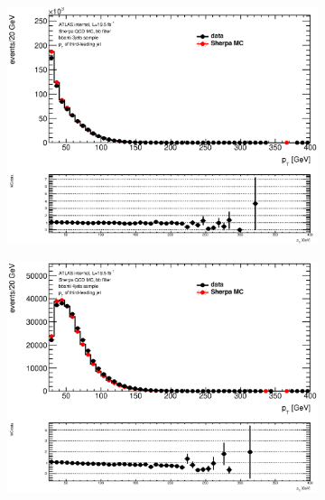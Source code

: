 \begin{figure}[phtb!]
\begin{center}
  \begin{subfigure}[$bbanti$ 3 jet category]{0.3\textwidth}\includegraphics[width=\textwidth]{MonteCarlo/figures/pt2_bbanti_3jets.eps}\end{subfigure}
  \begin{subfigure}[$bbanti$ 4 jet category]{0.3\textwidth}\includegraphics[width=\textwidth]{MonteCarlo/figures/pt2_bbanti_4jets.eps}\end{subfigure}

\end{center}
\end{figure}
